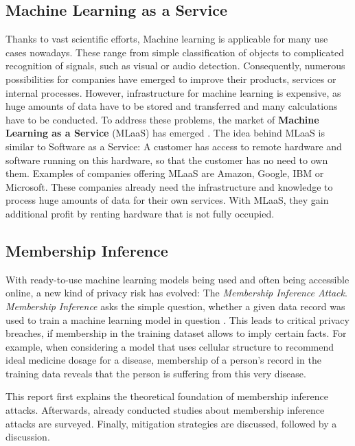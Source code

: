 \documentclass[runningheads]{llncs}
\begin{document}
\subsection{Machine Learning as a Service}

Thanks to vast scientific efforts, Machine learning is applicable for many use cases nowadays. These range from simple classification of objects to complicated recognition of signals, such as visual or audio detection. Consequently, numerous possibilities for companies have emerged to improve their products, services or internal processes. However, infrastructure for machine learning is expensive, as huge amounts of data have to be stored and transferred and many calculations have to be conducted. To address these problems, the market of \textbf{Machine Learning as a Service} (MLaaS) has emerged \cite{ribeiro2015mlaas}. The idea behind MLaaS is similar to Software as a Service: A customer has access to remote hardware and software running on this hardware, so that the customer has no need to own them. Examples of companies offering MLaaS are Amazon, Google, IBM or Microsoft. These companies already need the infrastructure and knowledge to process huge amounts of data for their own services. With MLaaS, they gain additional profit by renting hardware that is not fully occupied.

\subsection{Membership Inference}

With ready-to-use machine learning models being used and often being accessible online, a new kind of privacy risk has evolved: The \textit{Membership Inference Attack}. \textit{Membership Inference} asks the simple question, whether a given data record was used to train a machine learning model in question \cite{shokri2017membership}. This leads to critical privacy breaches, if membership in the training dataset allows to imply certain facts. For example, when considering a model that uses cellular structure to recommend ideal medicine dosage for a disease, membership of a person's record in the training data reveals that the person is suffering from this very disease.

This report first explains the theoretical foundation of membership inference attacks. Afterwards, already conducted studies about membership inference attacks are surveyed. Finally, mitigation strategies are discussed, followed by a discussion.
\end{document}
